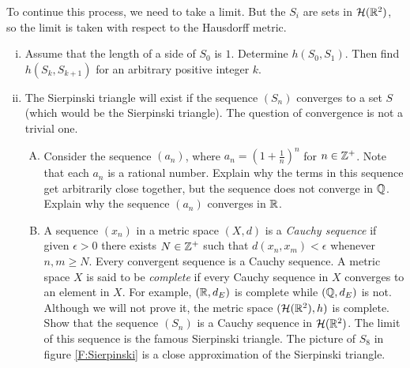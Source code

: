 \begin{activity}
To continue this process, we need to take a limit. But the $S_i$ are sets in $\mathcal{H}(\mathbb{R}^2)$, so the limit is taken with respect to the Hausdorff metric. 

	\begin{enumerate}[i.]
	
	\item Assume that the length of a side of $S_0$ is $1$. Determine $h(S_0,S_1)$. Then find $h(S_k, S_{k+1})$ for an arbitrary positive integer $k$. 
	
	\item The Sierpinski triangle will exist if the sequence $(S_n)$ converges to a set $S$ (which would be the Sierpinski triangle). The question of convergence is not a trivial one. 
	
		\begin{enumerate}[A.]
		
		\item Consider the sequence $(a_n)$, where $a_n = \left(1+\frac{1}{n}\right)^n$ for $n \in \mathbb{Z}^+$. Note that each $a_n$ is a rational number. Explain why the terms in this sequence get arbitrarily close together, but the sequence does not converge in $\mathbb{Q}$. Explain why the sequence $(a_n)$ converges in $\mathbb{R}$. 
		
	\item A sequence $(x_n)$ in a metric space $(X,d)$ is a \emph{Cauchy sequence} if given $\epsilon > 0$ there exists $N \in \mathbb{Z}^+$ such that $d(x_n, x_m) < \epsilon$ whenever $n, m \geq N$. Every convergent sequence is a Cauchy sequence. A metric space $X$ is said to be \emph{complete} if every Cauchy sequence in $X$ converges to an element in $X$. For example, $(\mathbb{R}, d_E)$ is complete while $(\mathbb{Q}, d_E)$ is not. Although we will not prove it, the metric space $(\mathcal{H}(\mathbb{R}^2), h)$ is complete. Show that the sequence $(S_n)$ is a Cauchy sequence in $\mathcal{H}(\mathbb{R}^2)$. The limit of this sequence is the famous Sierpinski triangle. The picture of $S_8$ in figure \ref{F:Sierpinski} is a close approximation of the Sierpinski triangle.
		
		\end{enumerate}
	
	\end{enumerate}

	\ea

\end{activity}

